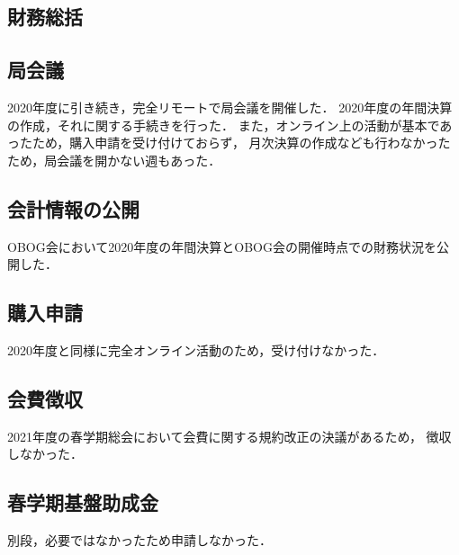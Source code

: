 \subsection*{財務総括}


\subsection*{局会議}
2020年度に引き続き，完全リモートで局会議を開催した．
2020年度の年間決算の作成，それに関する手続きを行った．
また，オンライン上の活動が基本であったため，購入申請を受け付けておらず，
月次決算の作成なども行わなかったため，局会議を開かない週もあった．

\subsection*{会計情報の公開}
OBOG会において2020年度の年間決算とOBOG会の開催時点での財務状況を公開した．

\subsection*{購入申請}
2020年度と同様に完全オンライン活動のため，受け付けなかった．

\subsection*{会費徴収}
2021年度の春学期総会において会費に関する規約改正の決議があるため，
徴収しなかった．

\subsection*{春学期基盤助成金}
別段，必要ではなかったため申請しなかった．
